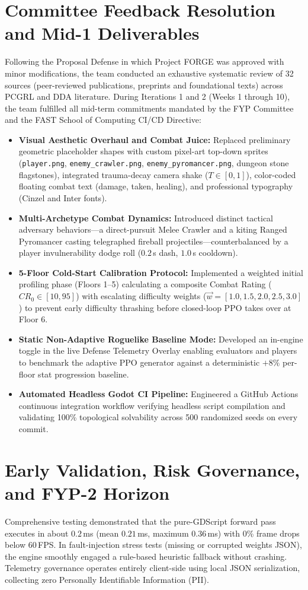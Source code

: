 \section*{Committee Feedback Resolution and Mid-1 Deliverables}
Following the Proposal Defense in which Project FORGE was approved with minor modifications, the team conducted an exhaustive systematic review of 32 sources (peer-reviewed publications, preprints and foundational texts) across PCGRL and DDA literature. During Iterations 1 and 2 (Weeks 1 through 10), the team fulfilled all mid-term commitments mandated by the FYP Committee and the FAST School of Computing CI/CD Directive:
\begin{itemize}
    \item \textbf{Visual Aesthetic Overhaul and Combat Juice:} Replaced preliminary geometric placeholder shapes with custom pixel-art top-down sprites (\texttt{player.png}, \texttt{enemy\_crawler.png}, \texttt{enemy\_pyromancer.png}, dungeon stone flagstones), integrated trauma-decay camera shake ($T \in [0, 1]$), color-coded floating combat text (damage, taken, healing), and professional typography (Cinzel and Inter fonts).
    \item \textbf{Multi-Archetype Combat Dynamics:} Introduced distinct tactical adversary behaviors---a direct-pursuit Melee Crawler and a kiting Ranged Pyromancer casting telegraphed fireball projectiles---counterbalanced by a player invulnerability dodge roll ($0.2$\,s dash, $1.0$\,s cooldown).
    \item \textbf{5-Floor Cold-Start Calibration Protocol:} Implemented a weighted initial profiling phase (Floors 1--5) calculating a composite Combat Rating ($CR_0 \in [10, 95]$) with escalating difficulty weights ($\vec{w} = [1.0, 1.5, 2.0, 2.5, 3.0]$) to prevent early difficulty thrashing before closed-loop PPO takes over at Floor 6.
    \item \textbf{Static Non-Adaptive Roguelike Baseline Mode:} Developed an in-engine toggle in the live Defense Telemetry Overlay enabling evaluators and players to benchmark the adaptive PPO generator against a deterministic $+8\%$ per-floor stat progression baseline.
    \item \textbf{Automated Headless Godot CI Pipeline:} Engineered a GitHub Actions continuous integration workflow verifying headless script compilation and validating 100\% topological solvability across 500 randomized seeds on every commit.
\end{itemize}

\section*{Early Validation, Risk Governance, and FYP-2 Horizon}
Comprehensive testing demonstrated that the pure-GDScript forward pass executes in about $0.2$\,ms (mean $0.21$\,ms, maximum $0.36$\,ms) with 0\% frame drops below 60\,FPS. In fault-injection stress tests (missing or corrupted weights JSON), the engine smoothly engaged a rule-based heuristic fallback without crashing. Telemetry governance operates entirely client-side using local JSON serialization, collecting zero Personally Identifiable Information (PII).

